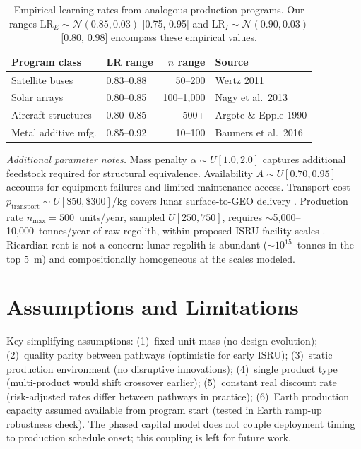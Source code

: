 \documentclass[preprint,12pt]{elsarticle}
\begin{document}
\begin{table}[htbp]
\centering
\caption{Empirical learning rates from analogous production programs. Our ranges $\mathrm{LR}_E \sim \mathcal{N}(0.85, 0.03)$ [0.75, 0.95] and $\mathrm{LR}_I \sim \mathcal{N}(0.90, 0.03)$ [0.80, 0.98] encompass these empirical values.}
\label{tab:empirical_lr}
\small
\begin{tabular}{@{}llrl@{}}
\toprule
Program class & LR range & $n$ range & Source \\
\midrule
Satellite buses          & 0.83--0.88 & 50--200    & Wertz 2011 \cite{wertz2011} \\
Solar arrays             & 0.80--0.85 & 100--1{,}000 & Nagy et al.\ 2013 \cite{nagy2013} \\
Aircraft structures      & 0.80--0.85 & 500+       & Argote \& Epple 1990 \cite{argote1990} \\
Metal additive mfg.      & 0.85--0.92 & 10--100    & Baumers et al.\ 2016 \cite{baumers2016} \\
\bottomrule
\end{tabular}
\end{table}

\emph{Additional parameter notes.} Mass penalty $\alpha \sim U[1.0, 2.0]$ captures additional feedstock required for structural equivalence. Availability $A \sim U[0.70, 0.95]$ accounts for equipment failures and limited maintenance access. Transport cost $p_{\mathrm{transport}} \sim U[\$50, \$300]$/kg covers lunar surface-to-GEO delivery \cite{ishimatsu2016}. Production rate $\dot{n}_{\max} = 500$~units/year, sampled $U[250, 750]$, requires $\sim$5{,}000--10{,}000~tonnes/year of raw regolith, within proposed ISRU facility scales \cite{sanders2015}. Ricardian rent is not a concern: lunar regolith is abundant (${\sim}10^{15}$~tonnes in the top 5~m) and compositionally homogeneous at the scales modeled.

\section{Assumptions and Limitations}
\label{sec:appendix_assumptions}

Key simplifying assumptions: (1)~fixed unit mass (no design evolution); (2)~quality parity between pathways (optimistic for early ISRU); (3)~static production environment (no disruptive innovations); (4)~single product type (multi-product would shift crossover earlier); (5)~constant real discount rate (risk-adjusted rates differ between pathways in practice); (6)~Earth production capacity assumed available from program start (tested in Earth ramp-up robustness check). The phased capital model does not couple deployment timing to production schedule onset; this coupling is left for future work.
\end{document}
